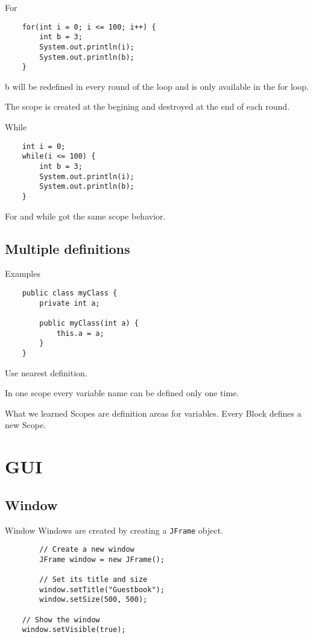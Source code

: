 \begin{frame}[fragile]{For}
    \begin{lstlisting}
    for(int i = 0; i <= 100; i++) {
        int b = 3;
        System.out.println(i);
        System.out.println(b);
    }\end{lstlisting}
    
    b will be redefined in every round of the loop and is only available in the for loop.
    
    The scope is created at the begining and destroyed at the end of each round.
\end{frame}

\begin{frame}[fragile]{While}
    \begin{lstlisting}
    int i = 0;
    while(i <= 100) {
        int b = 3;
        System.out.println(i);
        System.out.println(b);
    }\end{lstlisting}
    
    For and while got the same scope behavior.
\end{frame}
  
\subsection{Multiple definitions}
\begin{frame}[fragile]{Examples}
    \begin{lstlisting}
    public class myClass {
        private int a;
    
        public myClass(int a) {
            this.a = a;
        }
    }\end{lstlisting}

    Use nearest definition.

    In one scope every variable name can be defined only one time.
\end{frame}

\begin{frame}{What we learned}
    Scopes are definition areas for variables.
    Every Block defines a new Scope.
\end{frame}
    
\section{GUI}
\subsection{Window}
\begin{frame}[fragile]{Window}
  Windows are created by creating a \texttt{JFrame} object.
    \begin{lstlisting}
        // Create a new window
        JFrame window = new JFrame();

        // Set its title and size
        window.setTitle("Guestbook");
        window.setSize(500, 500);
    
    // Show the window
    window.setVisible(true);\end{lstlisting}
\end{frame}

